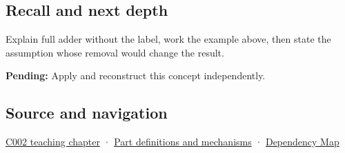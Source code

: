 \subsection{Recall and next depth}\label{appendix-d1a5b1e520c2-recall-and-next-depth}

Explain full adder without the label, work the example above, then state the assumption whose removal would change the result.

\textbf{Pending:} Apply and reconstruct this concept independently.

\subsection{Source and navigation}\label{appendix-d1a5b1e520c2-source-and-navigation}

\hyperref[01-foundations-i-ch001-arithmetic-becomes-a-policy]{C002 teaching chapter} · \hyperref[appendix-fd090d982a15]{Part definitions and mechanisms} · \hyperref[appendix-4ad47bdd269a]{Dependency Map}
